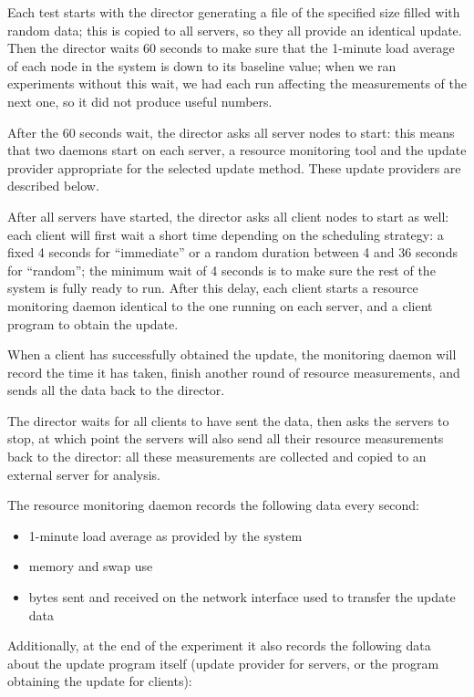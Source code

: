 \documentclass[a4paper,12pt]{article}
\begin{document}
Each test starts with the director generating a file of the specified size
filled with random data; this is copied to all servers, so they all provide
an identical update.  Then the director waits 60 seconds to make sure that
the 1-minute load average of each node in the system is down to its
baseline value; when we ran experiments without this wait, we had each
run affecting the measurements of the next one, so it did not produce
useful numbers.

After the 60 seconds wait, the director asks all server nodes to start:
this means that two daemons start on each server, a resource monitoring
tool and the update provider appropriate for the selected update method.
These update providers are described below.

After all servers have started, the director asks all client nodes to
start as well: each client will first wait a short time depending on
the scheduling strategy: a fixed 4 seconds for ``immediate'' or a
random duration between 4 and 36 seconds for ``random''; the minimum
wait of 4 seconds is to make sure the rest of the system is fully
ready to run. After this delay, each client starts a resource monitoring
daemon identical to the one running on each server, and a client
program to obtain the update.

When a client has successfully obtained the update, the monitoring
daemon will record the time it has taken, finish another round of
resource measurements, and sends all the data back to the director.

The director waits for all clients to have sent the data, then asks
the servers to stop, at which point the servers will also send all
their resource measurements back to the director: all these measurements
are collected and copied to an external server for analysis.

The resource monitoring daemon records the following data every
second:

\begin{itemize}
\item 1-minute load average as provided by the system
\item memory and swap use
\item bytes sent and received on the network interface used to
transfer the update data
\end{itemize}

Additionally, at the end of the experiment it also records the following
data about the update program itself (update provider for servers, or
the program obtaining the update for clients):
\end{document}
